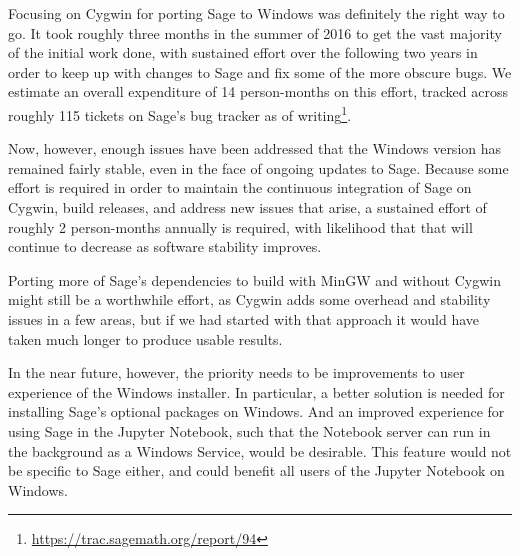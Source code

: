 Focusing on Cygwin for porting Sage to Windows was definitely the right way to
go. It took roughly three months in the summer of 2016 to get the vast majority
of the initial work done, with sustained effort over the following two years in
order to keep up with changes to Sage and fix some of the more obscure bugs.
We estimate an overall expenditure of 14 person-months on this effort, tracked
across roughly 115 tickets on Sage's bug tracker as of
writing\footnote{\url{https://trac.sagemath.org/report/94}}.

Now, however, enough issues have been addressed that the Windows version has
remained fairly stable, even in the face of ongoing updates to Sage. Because
some effort is required in order to maintain the continuous integration of Sage
on Cygwin, build releases, and address new issues that arise, a sustained
effort of roughly 2 person-months annually is required, with likelihood that
that will continue to decrease as software stability improves.

Porting more of Sage's dependencies to build with MinGW and without Cygwin
might still be a worthwhile effort, as Cygwin adds some overhead and stability
issues in a few areas, but if we had started with that approach it would have
taken much longer to produce usable results.

In the near future, however, the priority needs to be improvements to
user experience of the Windows installer. In particular, a better
solution is needed for installing Sage's optional packages on Windows.
And an improved experience for using Sage in the Jupyter Notebook, such
that the Notebook server can run in the background as a Windows Service,
would be desirable. This feature would not be specific to Sage either, and
could benefit all users of the Jupyter Notebook on Windows.
